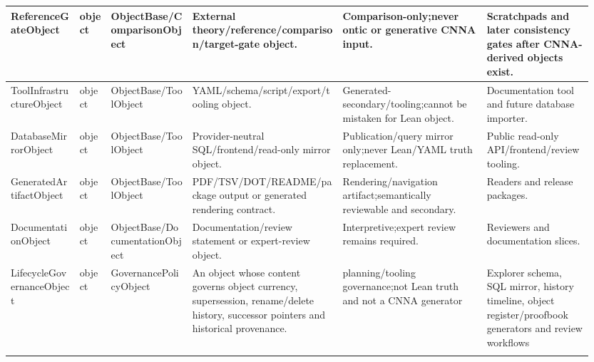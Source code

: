 \begin{longtable}{L{0.115\linewidth} L{0.055\linewidth} L{0.135\linewidth} L{0.245\linewidth} L{0.23\linewidth} L{0.17\linewidth}}
\hline
\addlinespace[0.24em]
ReferenceGateObject & object & ObjectBase/\allowbreak{}ComparisonObject & External theory/\allowbreak{}reference/\allowbreak{}comparison/\allowbreak{}target-gate object. & Comparison-only;\newline never ontic or generative CNNA input. & Scratchpads and later consistency gates after CNNA-derived objects exist.\\
\hline
\addlinespace[0.24em]
ToolInfrastructureObject & object & ObjectBase/\allowbreak{}ToolObject & YAML/\allowbreak{}schema/\allowbreak{}script/\allowbreak{}export/\allowbreak{}tooling object. & Generated-secondary/\allowbreak{}tooling;\newline cannot be mistaken for Lean object. & Documentation tool and future database importer.\\
\hline
\addlinespace[0.24em]
DatabaseMirrorObject & object & ObjectBase/\allowbreak{}ToolObject & Provider-neutral SQL/\allowbreak{}frontend/\allowbreak{}read-only mirror object. & Publication/\allowbreak{}query mirror only;\newline never Lean/\allowbreak{}YAML truth replacement. & Public read-only API/\allowbreak{}frontend/\allowbreak{}review tooling.\\
\hline
\addlinespace[0.24em]
GeneratedArtifactObject & object & ObjectBase/\allowbreak{}ToolObject & PDF/\allowbreak{}TSV/\allowbreak{}DOT/\allowbreak{}README/\allowbreak{}package output or generated rendering contract. & Rendering/\allowbreak{}navigation artifact;\newline semantically reviewable and secondary. & Readers and release packages.\\
\hline
\addlinespace[0.24em]
DocumentationObject & object & ObjectBase/\allowbreak{}DocumentationObject & Documentation/\allowbreak{}review statement or expert-review object. & Interpretive;\newline expert review remains required. & Reviewers and documentation slices.\\
\hline
\addlinespace[0.24em]
LifecycleGovernanceObject & object & GovernancePolicyObject & An object whose content governs object currency, supersession, rename/\allowbreak{}delete history, successor pointers and historical provenance. & planning/\allowbreak{}tooling governance;\newline not Lean truth and not a CNNA generator & Explorer schema, SQL mirror, history timeline, object register/\allowbreak{}proofbook generators and review workflows\\
\hline
\addlinespace[0.24em]

\end{longtable}
